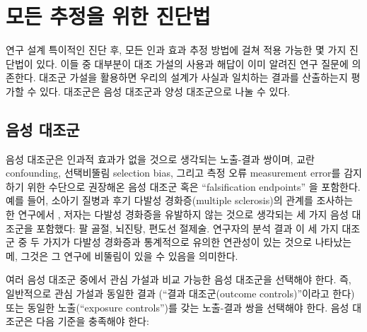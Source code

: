\documentclass[10.5pt]{book}
\theoremstyle{definition}
\theoremstyle{definition}
\theoremstyle{definition}
\theoremstyle{remark}
\begin{document}
\section{모든 추정을 위한 진단법}\label{---}

연구 설계 특이적인 진단 후, 모든 인과 효과 추정 방법에 걸쳐 적용 가능한
몇 가지 진단법이 있다. 이들 중 대부분이 대조 가설의 사용과 해답이 이미
알려진 연구 질문에 의존한다. 대조군 가설을 활용하면 우리의 설계가 사실과
일치하는 결과를 산출하는지 평가할 수 있다. 대조군은 음성 대조군과 양성
대조군으로 나눌 수 있다.

\subsection{음성 대조군}\label{NegativeControls}


음성 대조군은 인과적 효과가 없을 것으로 생각되는 노출-결과 쌍이며, 교란
confounding, \citep{lipsitch_2010} 선택비뚤림 selection bias, 그리고
측정 오류 measurement error를 감지하기 위한 수단으로 권장해온 음성
대조군 혹은 ``falsification endpoints'' \citep{prased_2013} 을 포함한다.
\citep{arnold_2016} 예를 들어, 소아기 질병과 후기 다발성 경화증(multiple
sclerosis)의 관계를 조사하는 한 연구에서 \citep{zaadstra_2008}, 저자는
다발성 경화증을 유발하지 않는 것으로 생각되는 세 가지 음성 대조군을
포함했다: 팔 골절, 뇌진탕, 편도선 절제술. 연구자의 분석 결과 이 세 가지
대조군 중 두 가지가 다발성 경화증과 통계적으로 유의한 연관성이 있는
것으로 나타났는메, 그것은 그 연구에 비뚤림이 있을 수 있음을 의미한다.

여러 음성 대조군 중에서 관심 가설과 비교 가능한 음성 대조군을 선택해야
한다. 즉, 일반적으로 관심 가설과 동일한 결과 (``결과 대조군(outcome
controls)''이라고 한다) 또는 동일한 노출(``exposure controls'')를 갖는
노출-결과 쌍을 선택해야 한다. 음성 대조군은 다음 기준을 충족해야 한다:
\end{document}
